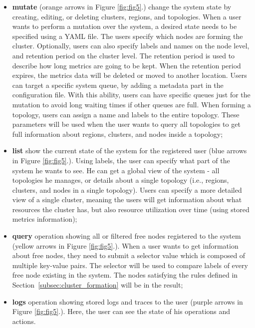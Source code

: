 \begin{itemize}
	\setlength{\itemsep}{1pt}
	\setlength{\parskip}{0pt}
	\setlength{\parsep}{0pt}
	\item \textbf{mutate} (orange arrows in Figure \ref{fig:fig5}.) change the system state by creating, editing, or deleting clusters, regions, and topologies. When a user wants to perform a mutation over the system, a desired state needs to be specified using a YAML file. The users specify which nodes are forming the cluster. Optionally, users can also specify labels and names on the node level, and retention period on the cluster level. The retention period is used to describe how long metrics are going to be kept. When the retention period expires, the metrics data will be deleted or moved to another location. Users can target a specific system queue, by adding a metadata part in the configuration file. With this ability, users can have specific queues just for the mutation to avoid long waiting times if other queues are full. When forming a topology, users can assign a name and labels to the entire topology. These parameters will be used when the user wants to query all topologies to get full information about regions, clusters, and nodes inside a topology; 
	\item \textbf{list} show the current state of the system for the registered user (blue arrows in Figure \ref{fig:fig5}.). Using labels, the user can specify what part of the system he wants to see. He can get a global view of the system - all topologies he manages, or details about a single topology (i.e., regions, clusters, and nodes in a single topology). Users can specify a more detailed view of a single cluster, meaning the users will get information about what resources the cluster has, but also resource utilization over time (using stored metrics information); 
	\item \textbf{query} operation showing all or filtered free nodes registered to the system (yellow arrows in Figure \ref{fig:fig5}.). When a user wants to get information about free nodes, they need to submit a selector value which is composed of multiple key-value pairs. The selector will be used to compare labels of every free node existing in the system. The nodes satisfying the rules defined in Section~\ref{subsec:cluster_formation} will be in the result; 
	\item \textbf{logs} operation showing stored logs and traces to the user (purple arrows in Figure \ref{fig:fig5}.). Here, the user can see the state of his operations and actions.
\end{itemize}

